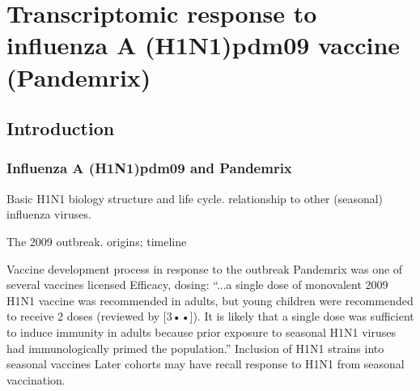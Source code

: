 %
%

\chapter{Transcriptomic response to influenza A (H1N1)pdm09 vaccine (Pandemrix)}


\section{Introduction}

\subsection{Influenza A (H1N1)pdm09 and Pandemrix}

\begin{outline}

\1 Basic H1N1 biology
    \2 structure and life cycle.
    \2 relationship to other (seasonal) influenza viruses.

\1 The 2009 outbreak.
    \2 origins; timeline

\1 Vaccine development process in response to the outbreak
    \2 Pandemrix was one of several vaccines licensed
    \2 Efficacy, dosing: \enquote{...a single dose of monovalent 2009 H1N1 vaccine was recommended in adults, but young children were recommended to receive 2 doses (reviewed by [3••]). It is likely that a single dose was sufficient to induce immunity in adults because prior exposure to seasonal H1N1 viruses had immunologically primed the population.}
    \2 Inclusion of H1N1 strains into seasonal vaccines
        \3 Later cohorts may have recall response to H1N1 from seasonal vaccination.

\end{outline}

